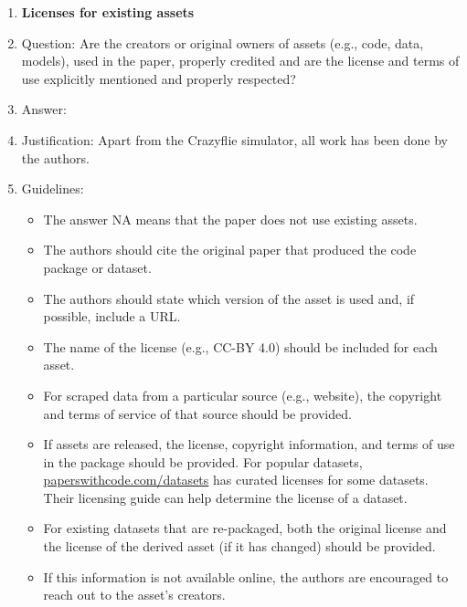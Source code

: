 \documentclass{article}
\begin{document}
\begin{enumerate}
\item {\bf Licenses for existing assets}
    \item[] Question: Are the creators or original owners of assets (e.g., code, data, models), used in the paper, properly credited and are the license and terms of use explicitly mentioned and properly respected?
    \item[] Answer: \answerYes{} %
    \item[] Justification: Apart from the Crazyflie simulator, all work has been done by the authors.
    \item[] Guidelines:
    \begin{itemize}
        \item The answer NA means that the paper does not use existing assets.
        \item The authors should cite the original paper that produced the code package or dataset.
        \item The authors should state which version of the asset is used and, if possible, include a URL.
        \item The name of the license (e.g., CC-BY 4.0) should be included for each asset.
        \item For scraped data from a particular source (e.g., website), the copyright and terms of service of that source should be provided.
        \item If assets are released, the license, copyright information, and terms of use in the package should be provided. For popular datasets, \url{paperswithcode.com/datasets} has curated licenses for some datasets. Their licensing guide can help determine the license of a dataset.
        \item For existing datasets that are re-packaged, both the original license and the license of the derived asset (if it has changed) should be provided.
        \item If this information is not available online, the authors are encouraged to reach out to the asset's creators.
    \end{itemize}


\end{enumerate}
\end{document}
